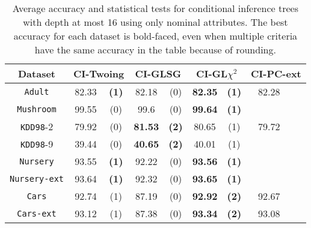     \begin{table}
    \small
      \centering
        \caption{Average accuracy and statistical tests  for  conditional inference trees 
with depth at most 16 using only nominal attributes. The best accuracy for each dataset is bold-faced, even when multiple criteria have the same accuracy in the table because of rounding.}

\begin{tabular}{c|cc|cc|cc|cc} 
Dataset             & \multicolumn{2}{c|}{CI-Twoing} &   \multicolumn{2}{c|}{CI-GLSG} & \multicolumn{2}{c|}{CI-GL$\chi^2$} & \multicolumn{2}{c}{CI-PC-ext}\\  \hline   
{\tt Adult}         & 82.33      &  {\bf (1)}        &   82.18      & (0)             & {\bf 82.35} &  {\bf (1)}           & 82.28       &                \\
{\tt Mushroom}      &  99.55     &  (0)              &   99.6       & (0)             & {\bf 99.64} &  {\bf (1)}           &             &                \\
{\tt KDD98}-2       &79.92       &  (0)              &  {\bf 81.53} & {\bf (2)}       &  80.65      &  (1)                 & 79.72       &                \\
{\tt KDD98}-9       & 39.44      &  (0)              &  {\bf 40.65} & {\bf (2)}       &  40.01      &  (1)                 &             &                \\
{\tt Nursery}       & 93.55      &  {\bf (1)}        &   92.22      & (0)             & {\bf 93.56} &  {\bf (1)}           &             &                \\
{\tt Nursery-ext}   & 93.64      &  {\bf (1)}        &   92.32      & (0)             & {\bf 93.65} &  {\bf (1)}           &             &                \\
{\tt Cars}          & 92.74      &  (1)              &   87.19      & (0)             & {\bf 92.92} &  {\bf (2)}           & 92.67       &                \\
{\tt Cars-ext}      & 93.12      &  (1)              &   87.38      & (0)             & {\bf 93.34} &  {\bf (2)}           & 93.08       &                \\

\end{tabular}
\end{table}

